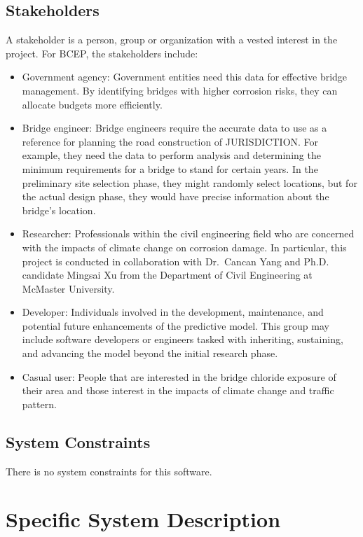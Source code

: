 \documentclass[12pt]{article}
\begin{document}
\subsection{Stakeholders} \label{Stakeholders}
 A stakeholder is a person, group or organization with a vested interest in the project. For BCEP, the stakeholders include:

\begin{itemize}
\item Government agency: Government entities need this data for effective bridge management. By identifying bridges with higher corrosion risks, they can allocate budgets more efficiently.
\item Bridge engineer: Bridge engineers require the accurate data to use as a reference for planning the road construction of JURISDICTION. For example, they need the data to perform analysis and determining the minimum requirements for a bridge to stand for certain years. In the preliminary site selection phase, they might randomly select locations, but for the actual design phase, they would have precise information about the bridge’s location.
\item Researcher: Professionals within the civil engineering field who are concerned with the impacts of climate change on corrosion damage. In particular, this project is conducted in collaboration with Dr.~Cancan Yang and Ph.D. candidate Mingsai Xu from the Department of Civil Engineering at McMaster University.
\item Developer: Individuals involved in the development, maintenance, and potential future enhancements of the predictive model. This group may include software developers or engineers tasked with inheriting, sustaining, and advancing the model beyond the initial research phase.
\item Casual user: People that are interested in the bridge chloride exposure of their area and those interest in the impacts of climate change and traffic pattern. 
\end{itemize}


\subsection{System Constraints}
There is no system constraints for this software.
  
\section{Specific System Description}
\end{document}

